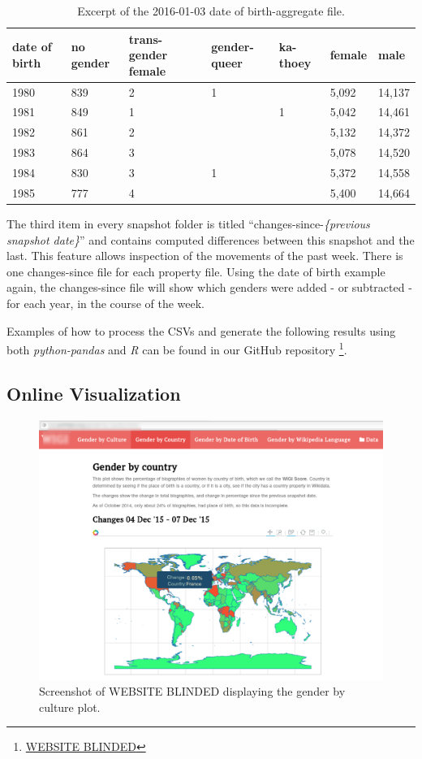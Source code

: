 \documentclass[letterpaper]{article}
\begin{document}
\begin{table}
\caption{Excerpt of the 2016-01-03 date of birth-aggregate file.}
\begin{tabular} {p{0.8cm}p{0.8cm}p{0.8cm}p{0.8cm}p{0.8cm}p{0.8cm}p{0.8cm}}
\toprule
date of birth & no gender & trans-gender female & gender-queer & ka-thoey & female & male \\
\midrule
1980 & 839 & 2 & 1 & & 5,092 & 14,137   \\
1981 & 849 & 1 &  & 1 &5,042 & 14,461 \\
1982 & 861 & 2 &  & &5,132 & 14,372  \\
1983 & 864 & 3 &  & &5,078 & 14,520  \\
1984 & 830 & 3 & 1 & &5,372 & 14,558   \\
1985 & 777 & 4 &  & &5,400 & 14,664  \\
\bottomrule
\end{tabular}
\label{table:dob}
\end{table}

The third item in every snapshot folder is titled ``changes-since-\textit{\{previous snapshot date\}}'' and contains computed differences between this snapshot and the last. This feature allows inspection of the movements of the past week. There is one changes-since file for each property file. Using the date of birth example again, the changes-since file will show which genders were added - or subtracted - for each year, in the course of the week.

Examples of how to process the CSVs and generate the following results using both \textit{python-pandas} and \textit{R} can be found in our GitHub repository \footnote{\url{WEBSITE BLINDED}}.

\subsection{Online Visualization}

\begin{figure}
\includegraphics[scale=0.2]{figures/website_screenshot.png}
\caption{Screenshot of WEBSITE BLINDED displaying the gender by culture plot.}
\label{fig:screenshot}
\end{figure}
\end{document}
